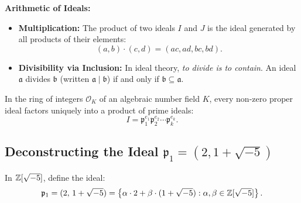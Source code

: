 \documentclass[a4paper]{article}
\begin{document}
\noindent\textbf{Arithmetic of Ideals:}
\begin{itemize}[leftmargin=2em]
 \item \textbf{Multiplication:} The product of two ideals $I$ and $J$ is the ideal generated by all products of their elements:
 \begin{equation}
  (a, b) \cdot (c, d) = (ac, ad, bc, bd).
 \end{equation}
 \item \textbf{Divisibility via Inclusion:} In ideal theory, \emph{to divide is to contain}. An ideal $\mathfrak{a}$ divides $\mathfrak{b}$ (written $\mathfrak{a} \mid \mathfrak{b}$) if and only if $\mathfrak{b} \subseteq \mathfrak{a}$.
\end{itemize}

\begin{theorem}[Dedekind]
In the ring of integers $\mathcal{O}_K$ of an algebraic number field $K$, every non-zero proper ideal factors uniquely into a product of prime ideals:
\begin{equation}
 I = \mathfrak{p}_1^{e_1} \mathfrak{p}_2^{e_2} \cdots \mathfrak{p}_k^{e_k}.
\end{equation}
\end{theorem}

\subsection{Deconstructing the Ideal \texorpdfstring{$\mathfrak{p}_1 = (2, 1+\sqrt{-5})$}{p1 = (2, 1+sqrt(-5))}}
\label{subsec:p1_deconstruct}
In $\mathbb{Z}[\sqrt{-5}]$, define the ideal:
\begin{equation}
 \mathfrak{p}_1 = (2, \, 1 + \sqrt{-5}) = \left\{ \alpha \cdot 2 + \beta \cdot (1 + \sqrt{-5}) : \alpha, \beta \in \mathbb{Z}[\sqrt{-5}] \right\}.
\end{equation}
\end{document}
